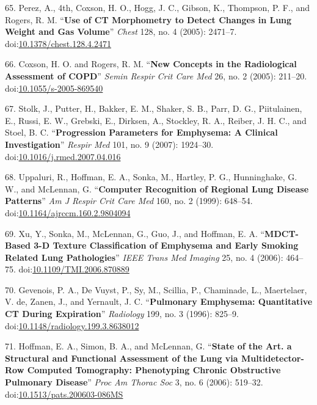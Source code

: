 \documentclass[11pt,]{article}
\begin{document}
\hypertarget{ref-Perez:2005aa}{}
65. Perez, A., 4th, Coxson, H. O., Hogg, J. C., Gibson, K., Thompson, P.
F., and Rogers, R. M. ``\textbf{Use of CT Morphometry to Detect Changes
in Lung Weight and Gas Volume}'' \emph{Chest} 128, no. 4 (2005):
2471--7.
doi:\href{https://doi.org/10.1378/chest.128.4.2471}{10.1378/chest.128.4.2471}

\hypertarget{ref-Coxson:2005aa}{}
66. Coxson, H. O. and Rogers, R. M. ``\textbf{New Concepts in the
Radiological Assessment of COPD}'' \emph{Semin Respir Crit Care Med} 26,
no. 2 (2005): 211--20.
doi:\href{https://doi.org/10.1055/s-2005-869540}{10.1055/s-2005-869540}

\hypertarget{ref-Stolk:2007aa}{}
67. Stolk, J., Putter, H., Bakker, E. M., Shaker, S. B., Parr, D. G.,
Piitulainen, E., Russi, E. W., Grebski, E., Dirksen, A., Stockley, R.
A., Reiber, J. H. C., and Stoel, B. C. ``\textbf{Progression Parameters
for Emphysema: A Clinical Investigation}'' \emph{Respir Med} 101, no. 9
(2007): 1924--30.
doi:\href{https://doi.org/10.1016/j.rmed.2007.04.016}{10.1016/j.rmed.2007.04.016}

\hypertarget{ref-Uppaluri:1999aa}{}
68. Uppaluri, R., Hoffman, E. A., Sonka, M., Hartley, P. G.,
Hunninghake, G. W., and McLennan, G. ``\textbf{Computer Recognition of
Regional Lung Disease Patterns}'' \emph{Am J Respir Crit Care Med} 160,
no. 2 (1999): 648--54.
doi:\href{https://doi.org/10.1164/ajrccm.160.2.9804094}{10.1164/ajrccm.160.2.9804094}

\hypertarget{ref-Xu:2006aa}{}
69. Xu, Y., Sonka, M., McLennan, G., Guo, J., and Hoffman, E. A.
``\textbf{MDCT-Based 3-D Texture Classification of Emphysema and Early
Smoking Related Lung Pathologies}'' \emph{IEEE Trans Med Imaging} 25,
no. 4 (2006): 464--75.
doi:\href{https://doi.org/10.1109/TMI.2006.870889}{10.1109/TMI.2006.870889}

\hypertarget{ref-Gevenois:1996aa}{}
70. Gevenois, P. A., De Vuyst, P., Sy, M., Scillia, P., Chaminade, L.,
Maertelaer, V. de, Zanen, J., and Yernault, J. C. ``\textbf{Pulmonary
Emphysema: Quantitative CT During Expiration}'' \emph{Radiology} 199,
no. 3 (1996): 825--9.
doi:\href{https://doi.org/10.1148/radiology.199.3.8638012}{10.1148/radiology.199.3.8638012}

\hypertarget{ref-Hoffman:2006aa}{}
71. Hoffman, E. A., Simon, B. A., and McLennan, G. ``\textbf{State of
the Art. a Structural and Functional Assessment of the Lung via
Multidetector-Row Computed Tomography: Phenotyping Chronic Obstructive
Pulmonary Disease}'' \emph{Proc Am Thorac Soc} 3, no. 6 (2006): 519--32.
doi:\href{https://doi.org/10.1513/pats.200603-086MS}{10.1513/pats.200603-086MS}
\end{document}
